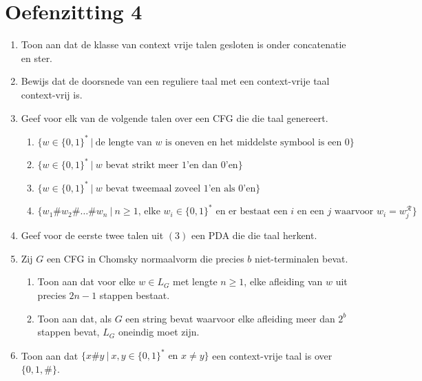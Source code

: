 \documentclass[a4paper]{article}
\begin{document}
\pagestyle{empty}
\section*{Oefenzitting 4}

\begin{enumerate}
   \item Toon aan dat de klasse van context vrije talen gesloten is onder concatenatie en ster.
	\item Bewijs dat de doorsnede van een reguliere taal met een context-vrije taal context-vrij is.
   \item Geef voor elk van de volgende talen over een CFG die die taal genereert.
         \begin{enumerate}
            \item $\{ w \in \{0,1\}^* \ | \ \text{de lengte van $w$ is oneven en het middelste symbool is een $0$} \}$
            \item $\{ w \in \{0,1\}^* \ | \ \text{$w$ bevat strikt meer $1$'en dan $0$'en} \}$
            \item $\{ w \in \{0,1\}^* \ | \ \text{$w$ bevat tweemaal zoveel $1$'en als $0$'en} \}$
            \item $\{ w_1 \# w_2 \# \ldots \# w_n \ | \ \text{$n \geq 1$, elke $w_i \in \{0,1\}^*$ en er bestaat een $i$ en een $j$ waarvoor $w_i = w_j^\mathcal{R}$} \}$
         \end{enumerate}
   \item Geef voor de eerste twee talen uit $(3)$ een PDA die die taal herkent.
   \item Zij $G$ een CFG in Chomsky normaalvorm die precies $b$ niet-terminalen bevat.
         \begin{enumerate}
            \item Toon aan dat voor elke $w \in L_G$ met lengte $n \geq 1$, elke afleiding van $w$ uit precies $2n - 1$ stappen bestaat.
            \item Toon aan dat, als $G$ een string bevat waarvoor elke afleiding meer dan $2^b$ stappen bevat, $L_G$ oneindig moet zijn.
         \end{enumerate}
   \item Toon aan dat $\{ x \# y \ | \ \text{$x,y \in \{0,1\}^*$ en $x \neq y$} \}$ een context-vrije taal is over $\{ 0,1,\# \}$.
\end{enumerate}
\end{document}
